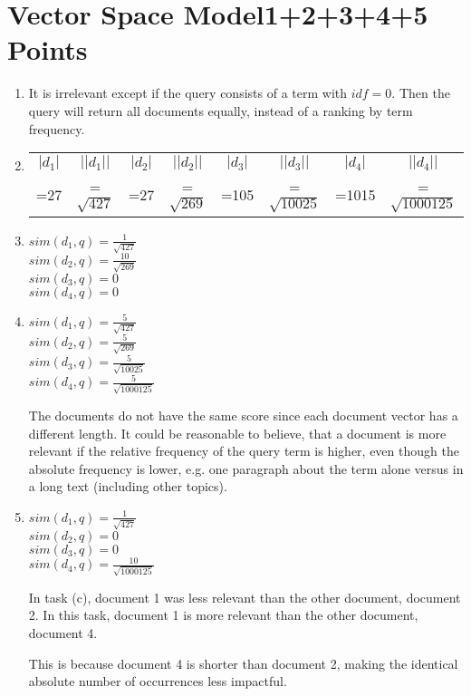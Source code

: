 \documentclass[10pt,a4paper]{article}
\begin{document}
\section{\hfill Vector Space Model\hfill 1+2+3+4+5 Points}
\begin{enumerate}
    \item It is irrelevant except if the query consists of a term with $idf=0$. Then the query will return all documents equally, instead of a ranking by term frequency.
    \item \begin{tabular}[t]{cccccccc}
             $|d_1|$&$||d_1||$&$|d_2|$&$||d_2||$&$|d_3|$&$||d_3||$&$|d_4|$&$||d_4||$\\
             =27&=$\sqrt{427}$&=27&=$\sqrt{269}$&=105&=$\sqrt{10025}$&=1015&=$\sqrt{1000125}$
        \end{tabular}
    \item $sim(d_1,q)=\frac{1}{\sqrt{427}}$\\
        $sim(d_2,q)=\frac{10}{\sqrt{269}}$\\
        $sim(d_3,q)=0$\\
        $sim(d_4,q)=0$
    \item $sim(d_1,q)=\frac{5}{\sqrt{427}}$\\
        $sim(d_2,q)=\frac{5}{\sqrt{269}}$\\
        $sim(d_3,q)=\frac{5}{\sqrt{10025}}$\\
        $sim(d_4,q)=\frac{5}{\sqrt{1000125}}$
        
        The documents do not have the same score since each document vector has a different length. It could be reasonable to believe, that a document is more relevant if the relative frequency of the query term is higher, even though the absolute frequency is lower, e.g. one paragraph about the term alone versus in a long text (including other topics).
    \item $sim(d_1,q)=\frac{1}{\sqrt{427}}$\\
        $sim(d_2,q)=0$\\
        $sim(d_3,q)=0$\\
        $sim(d_4,q)=\frac{10}{\sqrt{1000125}}$
        
        In task (c), document 1 was less relevant than the other document, document 2. In this task, document 1 is more relevant than the other document, document 4.
        
        This is because document 4 is shorter than document 2, making the identical absolute number of occurrences less impactful.
\end{enumerate}
\end{document}
